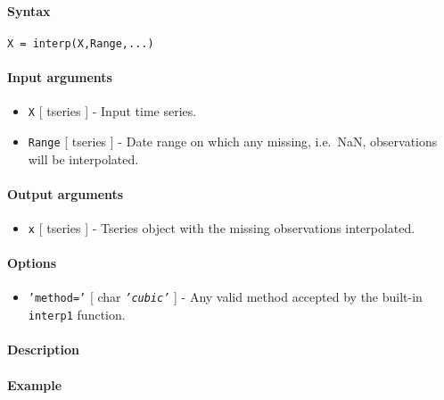 


	\paragraph{Syntax}\label{syntax}

\begin{verbatim}
X = interp(X,Range,...)
\end{verbatim}

\paragraph{Input arguments}\label{input-arguments}

\begin{itemize}
\item
  \texttt{X} {[} tseries {]} - Input time series.
\item
  \texttt{Range} {[} tseries {]} - Date range on which any missing,
  i.e.~NaN, observations will be interpolated.
\end{itemize}

\paragraph{Output arguments}\label{output-arguments}

\begin{itemize}
\itemsep1pt\parskip0pt
\item
  \texttt{x} {[} tseries {]} - Tseries object with the missing
  observations interpolated.
\end{itemize}

\paragraph{Options}\label{options}

\begin{itemize}
\itemsep1pt\parskip0pt
\item
  \texttt{'method='} {[} char \textbar{} \emph{\texttt{'cubic'}} {]} -
  Any valid method accepted by the built-in \texttt{interp1} function.
\end{itemize}

\paragraph{Description}\label{description}

\paragraph{Example}\label{example}


